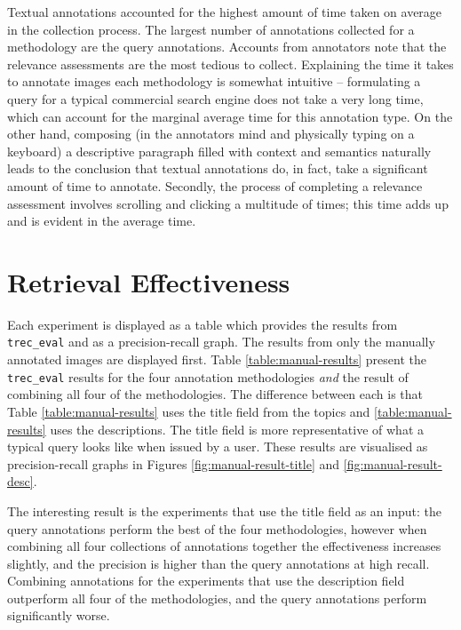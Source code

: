 Textual annotations accounted for the highest amount of time taken on average in the collection process. The largest number of annotations collected for a methodology are the query annotations. Accounts from annotators note that the relevance assessments are the most tedious to collect. Explaining the time it takes to annotate images each methodology is somewhat intuitive -- formulating a query for a typical commercial search engine does not take a very long time, which can account for the marginal average time for this annotation type. On the other hand, composing (in the annotators mind and physically typing on a keyboard) a descriptive paragraph filled with context and semantics naturally leads to the conclusion that textual annotations do, in fact, take a significant amount of time to annotate. Secondly, the process of completing a relevance assessment involves scrolling and clicking a multitude of times; this time adds up and is evident in the average time.

\FloatBarrier
\section{Retrieval Effectiveness}

Each experiment is displayed as a table which provides the results from \verb|trec_eval| and as a precision-recall graph. The results from only the manually annotated images are displayed first. Table \ref{table:manual-results} present the \verb|trec_eval| results for the four annotation methodologies \textit{and} the result of combining all four of the methodologies. The difference between each is that Table \ref{table:manual-results} uses the title field from the topics and \ref{table:manual-results} uses the descriptions. The title field is more representative of what a typical query looks like when issued by a user. These results are visualised as precision-recall graphs in Figures \ref{fig:manual-result-title} and \ref{fig:manual-result-desc}.

The interesting result is the experiments that use the title field as an input: the query annotations perform the best of the four methodologies, however when combining all four collections of annotations together the effectiveness increases slightly, and the precision is higher than the query annotations at high recall. Combining annotations for the experiments that use the description field outperform all four of the methodologies, and the query annotations perform significantly worse.

